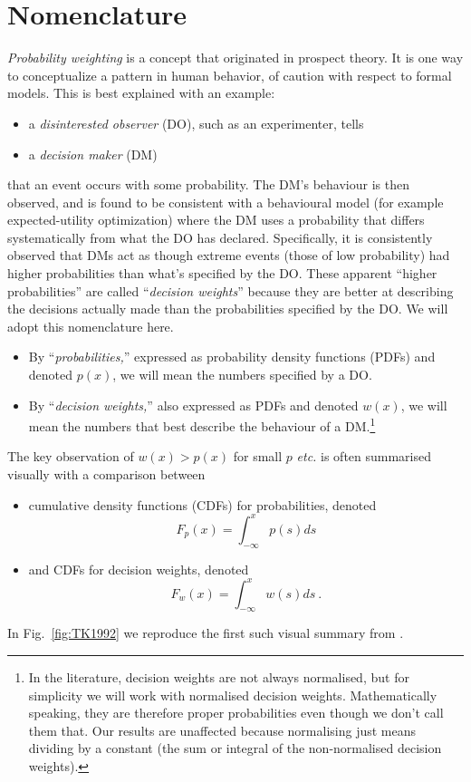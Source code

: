 \documentclass[a4paper, 12pt]{article}
\newcommand{\bi}{\begin{itemize}}
\newcommand{\ei}{\end{itemize}}
\newcommand{\fref}[1]{Fig.~\ref{fig:#1}}
\newcommand{\etc}{{\it etc.}\xspace}
\newcommand{\be}{\begin{equation}}
\newcommand{\ee}{\end{equation}}
\begin{document}
\section{Nomenclature}
{\it Probability weighting} is a concept that originated in prospect theory. It is one way to conceptualize a pattern in human behavior, of caution with respect to formal models.
This is best explained with an example:
\bi
	\item a \textit{disinterested observer} (DO), such as an experimenter, tells
	\item a \textit{decision maker} (DM) 
\ei
that an event occurs with some probability. The DM's behaviour is then observed, and is found to be consistent with a behavioural model (for example expected-utility optimization) where the DM uses a probability that differs systematically from what the DO has declared.
% 
Specifically, it is consistently observed that DMs act as though extreme events (those of low probability) had higher probabilities than what's specified by the DO. These apparent ``higher probabilities'' are called ``{\it decision weights}'' because they are better at describing the decisions actually made than the probabilities specified by the DO. We will adopt this nomenclature here. 
\bi
	\item By ``\textit{probabilities,}'' expressed as probability density functions (PDFs) and denoted $p(x)$, we will mean the numbers specified by a DO.
	\item By ``\textit{decision weights,}'' also expressed as PDFs and denoted $w(x)$, we will mean the numbers that best describe the behaviour of a DM.\footnote{In the literature, decision weights are not always normalised, but for simplicity we will work with normalised decision weights. Mathematically speaking, they are therefore proper probabilities even though we don't call them that. Our results are unaffected because normalising just means dividing by a constant (the sum or integral of the non-normalised decision weights).}
\ei

The key observation of $w(x)>p(x)$ for small $p$ \etc is often summarised visually with a comparison between 
\bi
\item cumulative density functions (CDFs) for probabilities, denoted 
\be
F_p(x)=\int_{-\infty}^x p(s) ds
\ee
\item and CDFs for decision weights, denoted
\be
F_w(x)=\int_{-\infty}^x w(s) ds ~.
\ee
\ei
In \fref{TK1992} we reproduce the first such visual summary from \cite[p.~310]{TverskyKahneman1992}.
\end{document}
